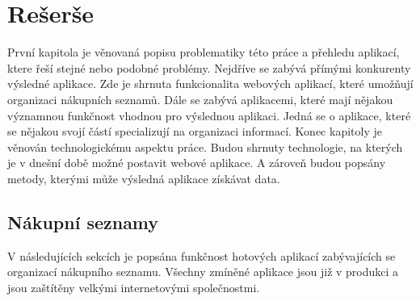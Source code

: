 
%

\chapter{Rešerše}
První kapitola je věnovaná popisu problematiky této práce a přehledu aplikací, ktere řeší stejné nebo podobné problémy.
Nejdříve se zabývá přímými konkurenty výsledné aplikace. Zde je shrnuta funkcionalita webových aplikací, které umožňují organizaci nákupních seznamů.
Dále se zabývá aplikacemi, které mají nějakou významnou funkčnost vhodnou pro výslednou aplikaci. Jedná se o aplikace, které se nějakou svojí částí specializují na organizaci informací. Konec kapitoly je věnován technologickému aspektu práce. Budou shrnuty technologie, na kterých je v dnešní době možné postavit webové aplikace.
A zároveň budou popsány metody, kterými může výsledná aplikace získávat data.

\section{Nákupní seznamy}
\label{sec:nakupni-seznamy}
V následujících sekcích je popsána funkčnost hotových aplikací zabývajících se organizací nákupního seznamu. Všechny zmíněné aplikace jsou již v produkci a jsou zaštítěny velkými internetovými společnostmi.

